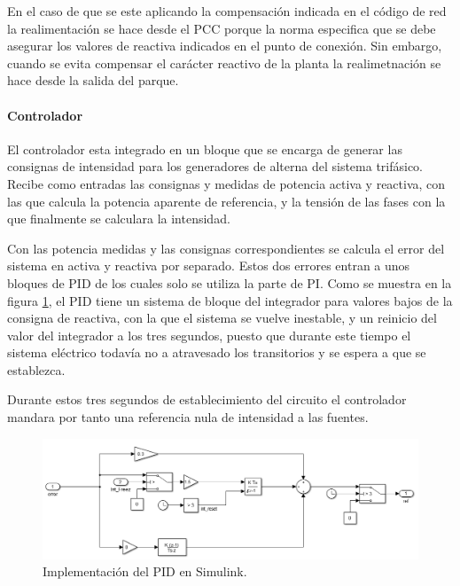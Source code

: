 \documentclass{book}
\begin{document}
En el caso de que se este aplicando la compensaci\'on indicada en el c\'odigo de red la realimentaci\'on se hace desde el PCC porque la norma especifica que se debe asegurar los valores de reactiva indicados en el punto de conexi\'on. Sin embargo, cuando se evita compensar el car\'acter reactivo de la planta la realimetnaci\'on se hace desde la salida del parque. \par

\paragraph{Controlador}

El controlador esta integrado en un bloque que se encarga de generar las consignas de intensidad para los generadores de alterna del sistema trif\'asico. Recibe como entradas las consignas y medidas de potencia activa y reactiva, con las que calcula la potencia aparente de referencia, y la tensi\'on de las fases con la que finalmente se calculara la intensidad. \par

Con las potencia medidas y las consignas correspondientes se calcula el error del sistema en activa y reactiva por separado. Estos dos errores entran a unos bloques de PID de los cuales solo se utiliza la parte de PI. Como se muestra en la figura \ref{PID_PQ}, el PID tiene un sistema de bloque del integrador para valores bajos de la consigna de reactiva, con la que el sistema se vuelve inestable, y un reinicio del valor del integrador a los tres segundos, puesto que durante este tiempo el sistema el\'ectrico todav\'ia no a atravesado los transitorios y se espera a que se establezca. \par

Durante estos tres segundos de establecimiento del circuito el controlador mandara por tanto una referencia nula de intensidad a las fuentes. \par  

\begin{figure}[h!]
\centering
\includegraphics[width=1\textwidth]{PID_PQ.PNG}
\caption{Implementaci\'on del PID en Simulink. }
\label{PID_PQ}
\end{figure} \par
\end{document}
